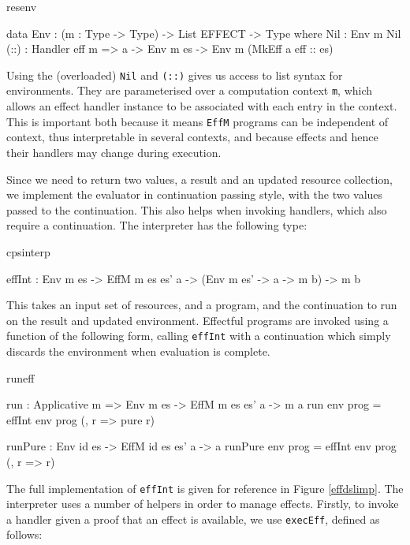 \begin{SaveVerbatim}{resenv}

data Env  : (m : Type -> Type) -> 
            List EFFECT -> Type where
     Nil  : Env m Nil
     (::) : Handler eff m => 
            a -> Env m es -> Env m (MkEff a eff :: es)

\end{SaveVerbatim}
\label{sect:envdef}

\noindent
Using the (overloaded) \texttt{Nil} and \texttt{(::)} gives us access to list
syntax for environments. They are parameterised over a computation context
\texttt{m}, which allows an effect handler instance to be associated with each
entry in the context. This is important both because it means \texttt{EffM}
programs can be independent of context, thus interpretable in several
contexts, and because effects and hence their handlers may change during 
execution.

Since we need to return two values, a result and an updated resource collection,
we implement the evaluator in continuation passing style, with the two values
passed to the continuation. This also helps when invoking handlers, which also
require a continuation. The interpreter has the following type:

\begin{SaveVerbatim}{cpsinterp}

effInt : Env m es -> EffM m es es' a -> 
         (Env m es' -> a -> m b) -> m b

\end{SaveVerbatim}

\noindent
This takes an input set of resources, and a program, and the continuation to run
on the result and updated environment. Effectful programs are invoked using
a function of the following form, calling \texttt{effInt}
with a continuation which simply discards the environment when evaluation is
complete.

\begin{SaveVerbatim}{runeff}

run : Applicative m => 
      Env m es -> EffM m es es' a -> m a
run env prog = effInt env prog (\env, r => pure r)

runPure : Env id es -> EffM id es es' a -> a
runPure env prog = effInt env prog (\env, r => r)

\end{SaveVerbatim}

\noindent
The full implementation of \texttt{effInt} is given for reference in
Figure \ref{effdslimp}. The interpreter uses a number of helpers in order
to manage effects. Firstly, to invoke a handler given a proof that an effect
is available, we use \texttt{execEff}, defined as follows:

